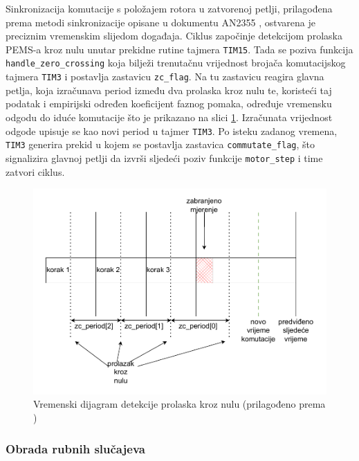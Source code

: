\documentclass[diplomskirad, upload]{fer}
\begin{document}
Sinkronizacija komutacije s položajem rotora u zatvorenoj petlji, prilagođena
prema metodi sinkronizacije opisane u dokumentu AN2355 \cite{NXP_AN2355},
ostvarena je preciznim vremenskim slijedom događaja. Ciklus započinje
detekcijom prolaska PEMS-a kroz nulu unutar prekidne rutine tajmera
\texttt{TIM15}. Tada se poziva funkcija \texttt{handle\_zero\_crossing} koja
bilježi trenutačnu vrijednost brojača komutacijskog tajmera \texttt{TIM3} i
postavlja zastavicu \texttt{zc\_flag}. Na tu zastavicu reagira glavna petlja,
koja izračunava period između dva prolaska kroz nulu te, koristeći taj podatak
i empirijski određen koeficijent faznog pomaka, određuje vremensku odgodu do
iduće komutacije što je prikazano na slici \ref{fig:closed_loop_zc}. Izračunata
vrijednost odgode upisuje se kao novi period u tajmer \texttt{TIM3}. Po isteku
zadanog vremena, \texttt{TIM3} generira prekid u kojem se postavlja zastavica
\texttt{commutate\_flag}, što signalizira glavnoj petlji da izvrši sljedeći
poziv funkcije \texttt{motor\_step} i time zatvori ciklus.

\begin{figure}[h!]
	\centering
	\includegraphics[width=\textwidth]{csv/closed_loop_zc.pdf}
	\caption{Vremenski dijagram detekcije prolaska kroz nulu (prilagođeno prema \cite{NXP_AN2355})}
	\label{fig:closed_loop_zc}
\end{figure}

\subsubsection{Obrada rubnih slučajeva}
\label{sssec:rubni_slucajevi}
\end{document}
